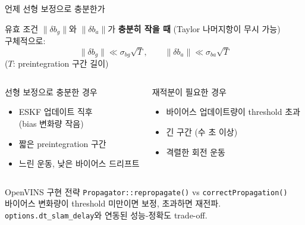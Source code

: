 \begin{frame}{언제 선형 보정으로 충분한가}

  \begin{block}{유효 조건}
    $\|\delta b_g\|$와 $\|\delta b_a\|$가 \textbf{충분히 작을 때}
    (Taylor 나머지항이 무시 가능)\\[4pt]
    구체적으로:
    \[
      \|\delta b_g\| \ll \sigma_{bg}\sqrt{T},
      \qquad
      \|\delta b_a\| \ll \sigma_{ba}\sqrt{T}
    \]
    ($T$: preintegration 구간 길이)
  \end{block}

  \pause
  \vspace{0.4em}
  \begin{columns}
    \begin{exampleblock}{선형 보정으로 충분한 경우}
      \begin{itemize}
        \item ESKF 업데이트 직후\\(bias 변화량 작음)
        \item 짧은 preintegration 구간
        \item 느린 운동, 낮은 바이어스 드리프트
      \end{itemize}
    \end{exampleblock}
    \begin{alertblock}{재적분이 필요한 경우}
      \begin{itemize}
        \item 바이어스 업데이트량이 threshold 초과
        \item 긴 구간 (수 초 이상)
        \item 격렬한 회전 운동
      \end{itemize}
    \end{alertblock}
  \end{columns}

  \pause
  \vspace{0.4em}
  \begin{block}{OpenVINS 구현 전략}
    \texttt{Propagator::repropagate()} vs \texttt{correctPropagation()}\\
    바이어스 변화량이 threshold 미만이면 보정, 초과하면 재전파.\\
    \texttt{options.dt\_slam\_delay}와 연동된 성능-정확도 trade-off.
  \end{block}
\end{frame}


